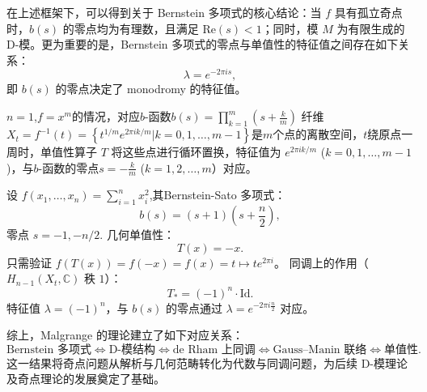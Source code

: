 在上述框架下，可以得到关于 Bernstein 多项式的核心结论：当 $f$ 具有孤立奇点时，$b(s)$ 的零点均为有理数，且满足 $\mathrm{Re}(s) < 1$；同时，模 $M$ 为有限生成的 D-模。更为重要的是，Bernstein 多项式的零点与单值性的特征值之间存在如下关系：
\begin{equation*}
    \lambda = e^{-2\pi i s},
\end{equation*}
即 $b(s)$ 的零点决定了 monodromy 的特征值。


\begin{example}
    $n=1$,$f=x^m$的情况，对应$b$-函数$b(s) =\prod_{k=1}^m (s+\frac{k}{m})$
    纤维$X_t=f^{-1}(t)=\left\{t^{1/m}e^{2\pi i k/m}|k=0,1,\ldots,m-1\right\}$是$m$个点的离散空间，$t$绕原点一周时，单值性算子 $T$ 将这些点进行循环置换，特征值为 $e^{2\pi i k/m}$ ($k=0,1,\ldots,m-1$)，与$b$-函数的零点$s=-\frac{k}{m}$ ($k=1,2,\ldots,m$）对应。
\end{example}

\begin{example}
    设 \(f(x_1,\dots,x_n) = \sum_{i=1}^n x_i^2\),其Bernstein-Sato 多项式：
    \[
        b(s) = (s+1)\left(s + \frac{n}{2}\right),
    \]
    零点 \(s = -1, -n/2\).
    几何单值性：
    \[
        T(x) = -x.
    \]
    只需验证 \(f(T(x)) = f(-x) = f(x) = t \mapsto t e^{2\pi i}\)。
    同调上的作用（\(H_{n-1}(X_t, \mathbb{C})\) 秩 $1$）：
    \[
        T_* = (-1)^n \cdot \mathrm{Id}.
    \]
    特征值 \(\lambda = (-1)^n\)，与 \(b(s)\) 的零点通过 $\lambda = e^{-2\pi i
                \frac{n}{2}}$ 对应。

\end{example}


综上，Malgrange 的理论建立了如下对应关系：
\[
    \text{Bernstein 多项式}
    \Longleftrightarrow
    \text{D-模结构}
    \Longleftrightarrow
    \text{de Rham 上同调}
    \Longleftrightarrow
    \text{Gauss--Manin 联络}
    \Longleftrightarrow
    \text{单值性}.
\]
这一结果将奇点问题从解析与几何范畴转化为代数与同调问题，为后续 D-模理论及奇点理论的发展奠定了基础。






